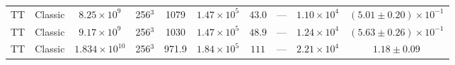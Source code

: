 \documentclass[aps, pre, onecolumn, nofootinbib, notitlepage, groupedaddress, amsfonts, amssymb, amsmath, longbibliography, superscriptaddress]{revtex4-1}
\begin{document}
\begin{table}[ht]
\begin{center}
{\begin{tabular}{c c c c c c c c c c}
TT	&	Classic		&	$8.25 \times 10^9$		&	256$^3$				&	1079		&	$1.47 \times 10^5$	&	$43.0$			&	---		&	$1.10 \times 10^4$  & $(5.01 \pm 0.20) \times 10^{-1}$ \\
TT	&	Classic		&	$9.17 \times 10^9$		&	256$^3$				&	1030		&	$1.47 \times 10^5$	&	$48.9$			&	---		&	$1.24 \times 10^4$  & $(5.63 \pm 0.26) \times 10^{-1}$ \\
TT	&	Classic		&	$1.834 \times 10^{10}$	&	256$^3$				&	971.9		&	$1.84 \times 10^5$	&	$111$			&	---		&	$2.21 \times 10^4$  & $1.18 \pm 0.09$ \\
\hline																	
\end{tabular}
}
\end{center}
\end{table}


\end{document}
